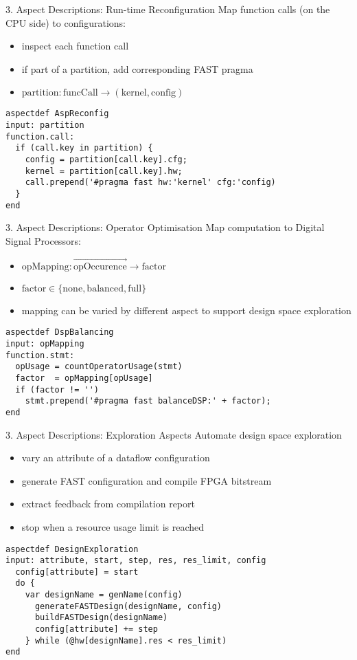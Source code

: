 \begin{frame}[fragile]{3. Aspect Descriptions: Run-time Reconfiguration}
  Map function calls (on the CPU side) to configurations:
  \begin{itemize}
  \item inspect each function call
  \item if part of a partition, add corresponding FAST pragma
  \item $ \text{partition} : \text{funcCall} \rightarrow (\text{kernel}, \text{config}) $
  \end{itemize}

  \begin{lstlisting}[style=lara]
aspectdef AspReconfig
input: partition
function.call:
  if (call.key in partition) {
    config = partition[call.key].cfg;
    kernel = partition[call.key].hw;
    call.prepend('#pragma fast hw:'kernel' cfg:'config)
  }
end
  \end{lstlisting}
\end{frame}

\begin{frame}[fragile]{3. Aspect Descriptions: Operator Optimisation}
  Map computation to Digital Signal Processors:
  \begin{itemize}
  \item $ \text{opMapping} : \overrightarrow{\text{opOccurence}} \rightarrow \text{factor}$
  \item $\text{factor} \in \{\text{none}, \text{balanced}, \text{full}\} $
  \item mapping can be varied by different aspect to support design
    space exploration
  \end{itemize}
  \begin{lstlisting}[label=lst:label, style=lara]
aspectdef DspBalancing
input: opMapping
function.stmt:
  opUsage = countOperatorUsage(stmt)
  factor  = opMapping[opUsage]
  if (factor != '')
    stmt.prepend('#pragma fast balanceDSP:' + factor);
end
  \end{lstlisting}
\end{frame}

\begin{frame}[fragile]{3. Aspect Descriptions: Exploration Aspects}
  Automate design space exploration
  \begin{itemize}
  \item vary an attribute of a dataflow configuration
  \item generate FAST configuration and compile FPGA bitstream
  \item extract feedback from compilation report
  \item stop when a resource usage limit is reached
  \end{itemize}
  \begin{lstlisting}[label=lst:label, style=lara]
aspectdef DesignExploration
input: attribute, start, step, res, res_limit, config
  config[attribute] = start
  do {
    var designName = genName(config)
      generateFASTDesign(designName, config)
      buildFASTDesign(designName)
      config[attribute] += step
    } while (@hw[designName].res < res_limit)
end
  \end{lstlisting}
\end{frame}

